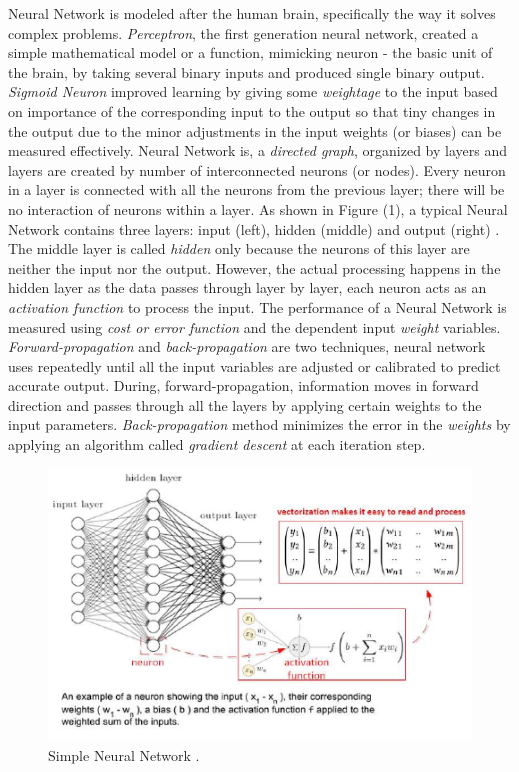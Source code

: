 \documentclass[sigconf]{acmart}
\begin{document}
	Neural Network is modeled after the human brain, specifically the way it solves complex problems. {\em Perceptron}, the first generation neural network, created a simple mathematical model or a function, mimicking neuron - the basic unit of the brain, by taking several binary inputs and produced single binary output. {\em Sigmoid Neuron} improved learning by giving some {\em weightage} to the input based on importance of the corresponding input to the output so that tiny changes in the output due to the minor adjustments in the input weights (or biases) can be measured effectively. Neural Network is, a {\em directed graph}, organized by layers and layers are created by number of interconnected neurons (or nodes). Every neuron in a layer is connected with all the neurons from the previous layer; there will be no interaction of neurons within a layer. As shown in Figure (1), a typical Neural Network contains three layers: input (left), hidden (middle) and output (right) \cite{Goodfellow2016}. The middle layer is called {\em hidden} only because the neurons of this layer are neither the input nor the output. However, the actual processing happens in the hidden layer as the data passes through layer by layer, each neuron acts as an {\em activation function} to process the input. The performance of a Neural Network is measured using {\em cost or error function} and the dependent input {\em weight} variables. {\em Forward-propagation} and {\em back-propagation} are two techniques, neural network uses repeatedly until all the input variables are adjusted or calibrated to predict accurate output. During, forward-propagation, information moves in forward direction and passes through all the layers by applying certain weights to the input parameters. {\em Back-propagation} method minimizes the error in the {\em weights} by applying an algorithm called {\em gradient descent} at each iteration step. 	


	\begin{figure}
		\centering
		\includegraphics[width=1.0\columnwidth]{images/neuralnetwork}
		\caption{Simple Neural Network \cite{Goodfellow2016, Gupta2017}.} \label{fig:figure1} 
	\end{figure}
\end{document}
